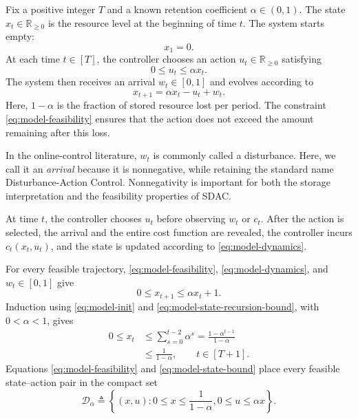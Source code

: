 \documentclass[journal]{IEEEtran}
\theoremstyle{remark}
\begin{document}
Fix a positive integer $T$ and a known retention coefficient
$\alpha\in(0,1)$. The state $x_t\in\mathbb{R}_{\ge0}$ is the resource level at the
beginning of time $t$. The system starts empty:
\begin{equation}
\label{eq:model-init}
x_1=0.
\end{equation}
At each time $t\in[T]$, the controller chooses an action
$u_t\in\mathbb{R}_{\ge0}$ satisfying
\begin{equation}
\label{eq:model-feasibility}
0\le u_t\le\alpha x_t.
\end{equation}
The system then receives an arrival $w_t\in[0,1]$ and evolves according to
\begin{equation}
\label{eq:model-dynamics}
x_{t+1}=\alpha x_t-u_t+w_t.
\end{equation}
Here, $1-\alpha$ is the fraction of stored resource lost per period.
The constraint \eqref{eq:model-feasibility} ensures that the action does not exceed
the amount remaining after this loss.

In the online-control literature, $w_t$ is commonly called a disturbance. Here, we
call it an \emph{arrival} because it is nonnegative, while retaining the standard
name Disturbance-Action Control. Nonnegativity is important for both the storage
interpretation and the
feasibility properties of SDAC.

At time $t$, the controller chooses $u_t$ before observing $w_t$ or $c_t$. After the
action is selected, the arrival and the entire cost function are revealed, the
controller incurs $c_t(x_t,u_t)$, and the state is updated according to
\eqref{eq:model-dynamics}.

For every feasible trajectory, \eqref{eq:model-feasibility},
\eqref{eq:model-dynamics}, and $w_t\in[0,1]$ give
\begin{equation}
\label{eq:model-state-recursion-bound}
0\le x_{t+1}\le\alpha x_t+1.
\end{equation}
Induction using \eqref{eq:model-init} and
\eqref{eq:model-state-recursion-bound}, with $0<\alpha<1$, gives
\begin{equation}
\label{eq:model-state-bound}
\begin{aligned}
0\le x_t
&\le\sum_{s=0}^{t-2}\alpha^s
=\frac{1-\alpha^{t-1}}{1-\alpha}\\
&\le\frac{1}{1-\alpha},
\qquad t\in[T+1].
\end{aligned}
\end{equation}
Equations \eqref{eq:model-feasibility} and \eqref{eq:model-state-bound}
place every feasible
state--action pair in the compact set
\begin{equation}
\label{eq:model-domain}
\mathcal{D}_\alpha
\triangleq
\left\{
(x,u):
0\le x\le\frac{1}{1-\alpha},
0\le u\le\alpha x
\right\}.
\end{equation}
\end{document}
